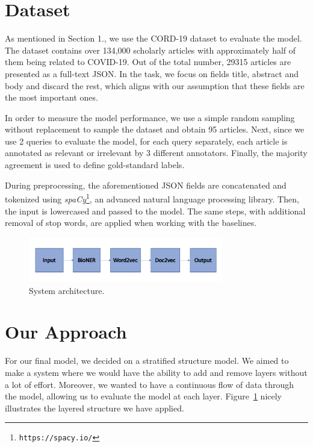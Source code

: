 \documentclass[10pt, a4paper]{article}
\begin{document}
	\section{Dataset}

	As mentioned in Section 1., we use the CORD-19 dataset to evaluate the model. The dataset contains over 134,000 scholarly articles with approximately half of them being related to COVID-19. Out of the total number, 29315 articles are presented as a full-text JSON. In the task, we focus on fields title, abstract and body and discard the rest, which aligns with our assumption that these fields are the most important ones.
	
	In order to measure the model performance, we use a simple random sampling without replacement to sample the dataset and obtain 95 articles. Next, since we use 2 queries to evaluate the model, for each query separately, each article is annotated as relevant or irrelevant by 3 different annotators. Finally, the majority agreement is used to define gold-standard labels.  
	
	During preprocessing, the aforementioned JSON fields are concatenated and tokenized using \emph{spaCy}\footnote{\texttt{https://spacy.io/}}, an advanced natural language processing library. Then, the input is lowercased and passed to the model. The same steps, with additional removal of stop words, are applied when working with the baselines.
	
	\begin{figure}[h]
		\centering
		\includegraphics[width=8.5cm]{model}
		\caption{ System architecture.}
		\label{figure:model1}
	\end{figure}
	
	\section{Our Approach}
	
	For our final model, we decided on a stratified structure model. We aimed to make a system where we would have the ability to add and remove layers without a lot of effort. Moreover, we wanted to have a continuous flow of data through the model, allowing us to evaluate the model at each layer. Figure~\ref{figure:model1} nicely illustrates the layered structure we have applied. 
	
\end{document}
